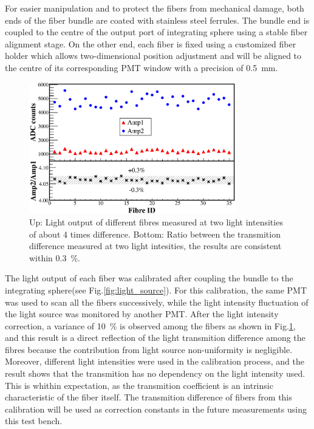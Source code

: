 \documentclass[review, times]{elsarticle}
\begin{document}
For easier manipulation and to protect the fibers from mechanical damage, both ends of the fiber bundle are coated with stainless steel ferrules.
The bundle end is coupled to the centre of the output port of integrating sphere using a stable fiber alignment stage.
On the other end, each fiber is fixed using a customized fiber holder which allows two-dimensional position adjustment and will be aligned to the centre of its corresponding PMT window with a precision of \SI{0.5}{\milli\meter}.

\begin{figure}
 \centering
 \includegraphics[width=90mm]{fibre_diff}
\caption{Up: Light output of different fibres measured at two light intensities of about 4 times difference.
Bottom: Ratio between the transmition difference measured at two light intesities, the results are consistent within \textpm\SI{0.3}{\percent}.}
\label{fig:fibre_diff}
\end{figure} 

The light output of each fiber was calibrated after coupling the bundle to the integrating sphere(see Fig.\ref{fig:light_source}).
For this calibration, the same PMT was used to scan all the fibers successively, while the light intensity fluctuation of the light source was monitored by another PMT.
After the light intensity correction, a variance of \SI{10}{\percent} is observed among the fibers as shown in Fig.\ref{fig:fibre_diff}, and this result is a direct reflection of the light transmition difference among the fibres because the contribution from light source non-uniformity is negligible.
Moreover, different light intensities were used in the calibration process, and the result shows that the transmition has no dependency on the light intensity used. 
This is whithin expectation, as the transmition coefficient is an intrinsic characteristic of the fiber itself.
The transmition difference of fibers from this calibration will be used as correction constants in the future measurements using this test bench.
\end{document}
